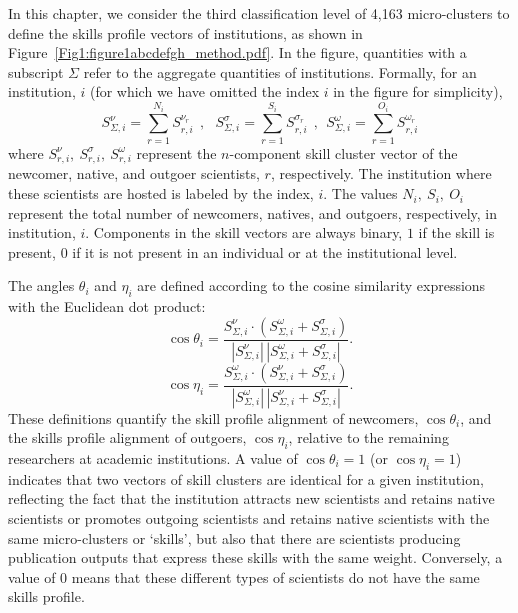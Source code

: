 \documentclass[draft,final]{vutinfth} %
\begin{document}
In this chapter, we consider the third classification level of 4,163 micro-clusters to define the skills profile vectors of institutions, as shown in Figure~\ref{Fig1:figure1abcdefgh_method.pdf}. In the figure, quantities with a subscript $\Sigma$ refer to the aggregate quantities of institutions. Formally, for an institution, $i$ (for which we have omitted the index $i$ in the figure for simplicity),
%
  \[ S^{\nu}_{\Sigma,i} = \sum_{r=1}^{N_i} S^{\nu_r}_{r,i} ~~,~~~ S^{\sigma}_{\Sigma,i} = \sum_{r=1}^{S_i} S^{\sigma_r}_{r,i} ~~,~~ S^{\omega}_{\Sigma,i} = \sum_{r=1}^{O_i} S^{\omega_r}_{r,i}
  \]
%  
where $S^{\nu}_{r,i},\ S^{\sigma}_{r,i},\ S^{\omega}_{r,i}$ represent the $n$-component skill cluster vector of the newcomer, native, and outgoer scientists, $r$, respectively. The institution where these scientists are hosted is labeled by the index, $i$.
The values $N_i,\ S_i,\ O_i$ represent the total number of newcomers, natives, and outgoers, respectively, in institution, $i$. 
Components in the skill vectors are always binary, $1$ if the skill is present, $0$ if it is not present in an individual or at the institutional level. 

The angles $\theta_i$ and $\eta_i$ are defined according to the cosine similarity expressions with the Euclidean dot product:
%
\begin{equation} \label{Eq.~1}
 \cos \theta_i = 
    \frac{S^{\nu}_{\Sigma,i}\cdot(S^{\omega}_{\Sigma,i}+S^{\sigma}_{\Sigma,i})}
        {|S^{\nu}_{\Sigma,i}|\, |S^{\omega}_{\Sigma,i}+S^{\sigma}_{\Sigma,i}|}. 
\end{equation}
%
\begin{equation} \label{Eq.~2}
   \cos\eta_i = 
        \frac{S^{\omega}_{\Sigma,i}\cdot(S^{\nu}_{\Sigma,i}+S^{\sigma}_{\Sigma,i})}
            {|S^{\omega}_{\Sigma,i}|\, |S^{\nu}_{\Sigma,i}+S^{\sigma}_{\Sigma,i}|}.
\end{equation}
%
These definitions quantify the skill profile alignment of newcomers, $\cos\theta_i$, and the skills profile alignment of outgoers, $\cos\eta_i$, relative to the remaining researchers at academic institutions. A value of $\cos\theta_i = 1$ (or $\cos\eta_i = 1$) indicates that two vectors of skill clusters are identical for a given institution, reflecting the fact that the institution attracts new scientists and retains native scientists or promotes outgoing scientists and retains native scientists with the same micro-clusters or `skills', but also that there are scientists producing publication outputs that express these skills with the same weight. Conversely, a value of $0$ means that these different types of scientists do not have the same skills profile. 
\end{document}
